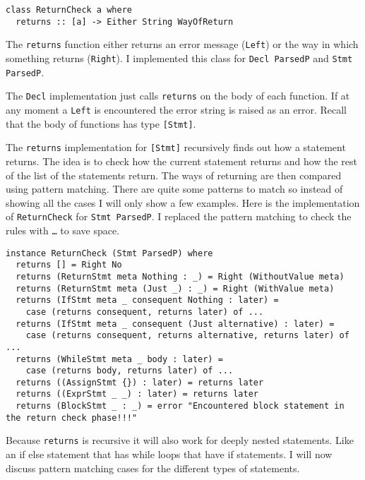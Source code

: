 \documentclass{report}
\begin{document}
\begin{verbatim}
class ReturnCheck a where
  returns :: [a] -> Either String WayOfReturn
\end{verbatim}

\noindent The \texttt{returns} function either returns an error message (\texttt{Left}) or the way in which something returns (\texttt{Right}). I implemented this class for \texttt{Decl ParsedP} and \texttt{Stmt ParsedP}. 

The \texttt{Decl} implementation just calls \texttt{returns} on the body of each function. If at any moment a \texttt{Left} is encountered the error string is raised as an error. Recall that the body of functions has type \texttt{[Stmt]}. 

The \texttt{returns} implementation for \texttt{[Stmt]} recursively finds out how a statement returns. The idea is to check how the current statement returns and how the rest of the list of the statements return. The ways of returning are then compared using pattern matching. 
There are quite some patterns to match so instead of showing all the cases I will only show a few examples. Here is the implementation of \texttt{ReturnCheck} for \texttt{Stmt ParsedP}. I replaced the pattern matching to check the rules with \texttt{\ldots} to save space. 

\begin{verbatim}
instance ReturnCheck (Stmt ParsedP) where
  returns [] = Right No
  returns (ReturnStmt meta Nothing : _) = Right (WithoutValue meta)
  returns (ReturnStmt meta (Just _) : _) = Right (WithValue meta)
  returns (IfStmt meta _ consequent Nothing : later) = 
    case (returns consequent, returns later) of ... 
  returns (IfStmt meta _ consequent (Just alternative) : later) = 
    case (returns consequent, returns alternative, returns later) of ...
  returns (WhileStmt meta _ body : later) = 
    case (returns body, returns later) of ...
  returns ((AssignStmt {}) : later) = returns later
  returns ((ExprStmt _ _) : later) = returns later
  returns (BlockStmt _ : _) = error "Encountered block statement in the return check phase!!!"
\end{verbatim}

\noindent Because \texttt{returns} is recursive it will also work for deeply nested statements. Like an if else statement that has while loops that have if statements. I will now discuss pattern matching cases for the different types of statements.
\end{document}
